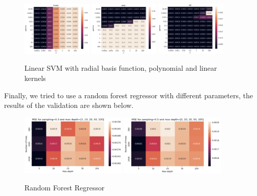 \documentclass[12pt]{article}
\begin{document}
\begin{figure}[h]
    \centering
    \includegraphics[width=0.3\textwidth]{svm_linear}
    \includegraphics[width=0.3\textwidth]{svm_poly}
    \includegraphics[width=0.3\textwidth]{svm_rbf}
    \caption{Linear SVM with radial basis function, polynomial and linear kernels}
    \label{fig:linear_svm}
\end{figure}

Finally, we tried to use a random forest regressor with different parameters,
the results of the validation are shown below.

\begin{figure}[h]
    \centering
    \includegraphics[width=0.45\textwidth]{rf_03}
    \includegraphics[width=0.45\textwidth]{rf_05}
    \caption{Random Forest Regressor}
    \label{fig:random_forest}
\end{figure}
\end{document}
